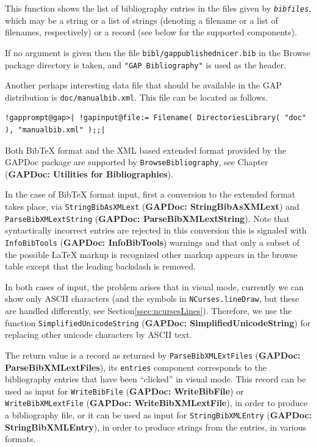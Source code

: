 \documentclass[a4paper,11pt]{report}
\begin{document}
{{{ This function shows the list of bibliography entries in the files given by \mbox{\texttt{\mdseries\slshape bibfiles}}, which may be a string or a list of strings (denoting a filename or a list of
filenames, respectively) or a record (see below for the supported components). 

 If no argument is given then the file \texttt{bibl/gap\texttt{}publishednicer.bib} in the \textsf{Browse} package directory is taken, and \texttt{"GAP Bibliography"} is used as the header. 

 Another perhaps interesting data file that should be available in the \textsf{GAP} distribution is \texttt{doc/manualbib.xml}. This file can be located as follows. 

 
\begin{Verbatim}[commandchars=!@|,fontsize=\small,frame=single,label=Example]
  !gapprompt@gap>| !gapinput@file:= Filename( DirectoriesLibrary( "doc" ), "manualbib.xml" );;|
\end{Verbatim}
 

 Both Bib{\TeX} format and the \textsf{XML} based extended format provided by the \textsf{GAPDoc} package are supported by \texttt{BrowseBibliography}, see Chapter{\nobreakspace} (\textbf{GAPDoc: Utilities for Bibliographies}). 

 In the case of Bib{\TeX} format input, first a conversion to the extended format takes place, via \texttt{StringBibAsXMLext} (\textbf{GAPDoc: StringBibAsXMLext}) and \texttt{ParseBibXMLextString} (\textbf{GAPDoc: ParseBibXMLextString}). Note that syntactically incorrect entries are rejected in this conversion
{\textendash}this is signaled with \texttt{InfoBibTools} (\textbf{GAPDoc: InfoBibTools}) warnings{\textendash} and that only a subset of the possible {\LaTeX} markup is recognized {\textendash}other markup appears in the browse table
except that the leading backslash is removed. 

 In both cases of input, the problem arises that in visual mode, currently we
can show only ASCII characters (and the symbols in \texttt{NCurses.lineDraw}, but these are handled differently, see Section{\nobreakspace}\ref{ssec:ncursesLines}). Therefore, we use the function \texttt{SimplifiedUnicodeString} (\textbf{GAPDoc: SimplifiedUnicodeString}) for replacing other unicode characters by ASCII text. 

 The return value is a record as returned by \texttt{ParseBibXMLExtFiles} (\textbf{GAPDoc: ParseBibXMLextFiles}), its \texttt{entries} component corresponds to the bibliography entries that have been ``clicked'' in visual mode. This record can be used as input for \texttt{WriteBibFile} (\textbf{GAPDoc: WriteBibFile}) or \texttt{WriteBibXMLextFile} (\textbf{GAPDoc: WriteBibXMLextFile}), in order to produce a bibliography file, or it can be used as input for \texttt{StringBibXMLEntry} (\textbf{GAPDoc: StringBibXMLEntry}), in order to produce strings from the entries, in various formats. 

}}}
\end{document}
